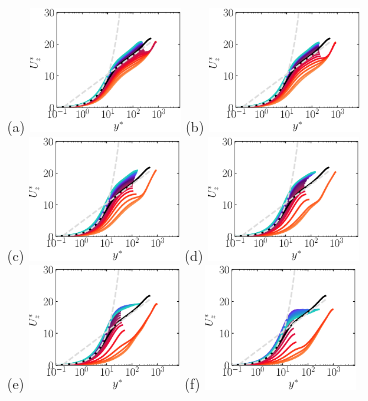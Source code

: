 \documentclass[lineno]{jfm}
\begin{document}
        \begin{figure}
        \centering
                (a) \includegraphics[width=4cm]{Figures/prof_uzstar_rotz0_roty0.00390625.eps}
                (b) \includegraphics[width=4cm]{Figures/prof_uzstar_rotz0_roty0.0078125.eps} \\
                (c) \includegraphics[width=4cm]{Figures/prof_uzstar_rotz0_roty0.015625.eps}
                (d) \includegraphics[width=4cm]{Figures/prof_uzstar_rotz0_roty0.03125.eps} \\
                (e) \includegraphics[width=4cm]{Figures/prof_uzstar_rotz0_roty0.0625.eps}
                (f) \includegraphics[width=4cm]{Figures/prof_uzstar_rotz0_roty0.125.eps} \\

\end{figure}
\end{document}
